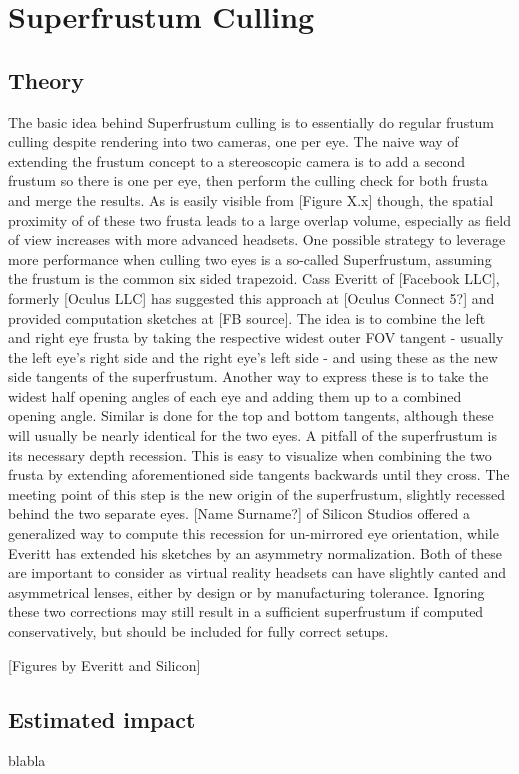 \section{Superfrustum Culling}
\subsection{Theory}
The basic idea behind Superfrustum culling is to essentially do regular frustum culling despite rendering into two cameras, one per eye. The naive way of extending the frustum concept to a stereoscopic camera is to add a second frustum so there is one per eye, then perform the culling check for both frusta and merge the results. 
As is easily visible from [Figure X.x] though, the spatial proximity of of these two frusta leads to a large overlap volume, especially as field of view increases with more advanced headsets. One possible strategy to leverage more performance when culling two eyes is a so-called Superfrustum, assuming the frustum is the common six sided trapezoid. Cass Everitt of [Facebook LLC], formerly [Oculus LLC] has suggested this approach at [Oculus Connect 5?] and provided computation sketches at [FB source]. The idea is to combine the left and right eye frusta by taking the respective widest outer FOV tangent - usually the left eye's right side and the right eye's left side - and using these as the new side tangents of the superfrustum. Another way to express these is to take the widest half opening angles of each eye and adding them up to a combined opening angle. Similar is done for the top and bottom tangents, although these will usually be nearly identical for the two eyes. 
A pitfall of the superfrustum is its necessary depth recession. This is easy to visualize when combining the two frusta by extending aforementioned side tangents backwards until they cross. The meeting point of this step is the new origin of the superfrustum, slightly recessed behind the two separate eyes. 
[Name Surname?] of Silicon Studios offered a generalized way to compute this recession for un-mirrored eye orientation, while Everitt has extended his sketches by an asymmetry normalization. Both of these are important to consider as virtual reality headsets can have slightly canted and asymmetrical lenses, either by design or by manufacturing tolerance. Ignoring these two corrections may still result in a sufficient superfrustum if computed conservatively, but should be included for fully correct setups. 


[Figures by Everitt and Silicon]
\subsection{Estimated impact}
blabla

